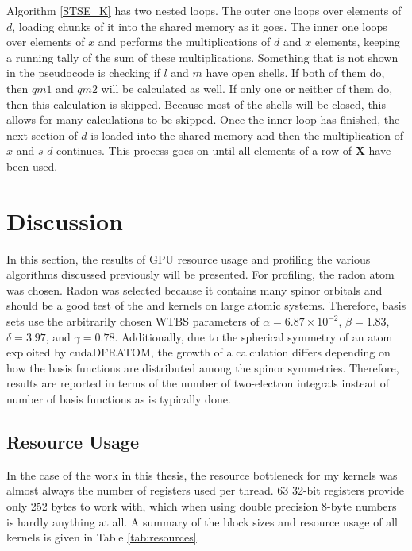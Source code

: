 Algorithm \ref{STSE_K} has two nested loops. The outer one loops over elements of $d$, loading chunks of it into the shared memory as it goes. The inner one loops over elements of $x$ and performs the multiplications of $d$ and $x$ elements, keeping a running tally of the sum of these multiplications. Something that is not shown in the pseudocode is checking if $l$ and $m$ have open shells. If both of them do, then $qm1$ and $qm2$ will be calculated as well. If only one or neither of them do, then this calculation is skipped. Because most of the shells will be closed, this allows for many calculations to be skipped. Once the inner loop has finished, the next section of $d$ is loaded into the shared memory and then the multiplication of $x$ and $s\_d$ continues. This process goes on until all elements of a row of \textbf{X} have been used.

\section{Discussion}
In this section, the results of GPU resource usage and profiling the various algorithms discussed previously will be presented. For profiling, the radon atom was chosen. Radon was selected because it contains many spinor orbitals and should be a good test of the  and  kernels on large atomic systems.  Therefore, basis sets use the arbitrarily chosen WTBS parameters of $\alpha = 6.87\times10^{-2}$, $\beta = 1.83$,  $\delta = 3.97$, and $\gamma = 0.78$. Additionally, due to the spherical symmetry of an atom exploited by cudaDFRATOM, the growth of a calculation differs depending on how the basis functions are distributed among the spinor symmetries. Therefore, results are reported in terms of the number of two-electron integrals instead of number of basis functions as is typically done.
\subsection{Resource Usage}
In the case of the work in this thesis, the resource bottleneck for my kernels was almost always the number of registers used per thread. 63 32-bit registers provide only 252 bytes to work with, which when using double precision 8-byte numbers is hardly anything at all. A summary of the block sizes and resource usage of all kernels is given in Table \ref{tab:resources}.

